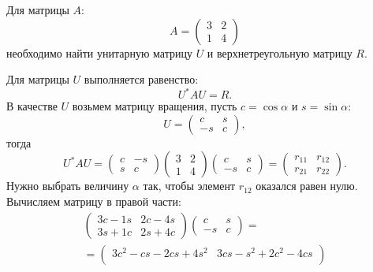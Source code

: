 \begin{example}
    Для матрицы $A$:
    \[
        A = \begin{pmatrix}
                3 & 2 \\
                1 & 4
        \end{pmatrix}
    \]
    необходимо найти унитарную матрицу $U$ и верхнетреугольную матрицу $R$.

    Для матрицы $U$ выполняется равенство:
    \[
        U^* A U = R.
    \]
    В качестве $U$ возьмем матрицу вращения, пусть $c = \cos \alpha$ и $s = \sin \alpha$:
    \[
        U
        = \begin{pmatrix}
              c  & s \\
              -s & c
        \end{pmatrix} ,
    \]
    тогда
    \[
        U^* A U
        = \begin{pmatrix}
              c & - s \\
              s & c
        \end{pmatrix}
        \begin{pmatrix}
            3 & 2 \\
            1 & 4
        \end{pmatrix}
        \begin{pmatrix}
            c   & s \\
            - s & c
        \end{pmatrix}
        = \begin{pmatrix}
              r_{11} & r_{12} \\
              r_{21} & r_{22}
        \end{pmatrix} .
    \]
    Нужно выбрать величину $\alpha$ так, чтобы элемент $r_{12}$ оказался равен нулю. Вычисляем матрицу в правой части:
    \begin{multline*}
        \begin{pmatrix}
            3 c - 1 s & 2 c - 4 s \\
            3 s + 1 c & 2 s + 4 c
        \end{pmatrix}
        \begin{pmatrix}
            c   & s \\
            - s & c
        \end{pmatrix}
        = \\
        = \begin{pmatrix}
              3 c^2 - c s - 2 c s + 4 s^2 & 3 c s - s^2 + 2 c^2 - 4 c s \\

\end{pmatrix}
\end{multline*}
\end{example}
